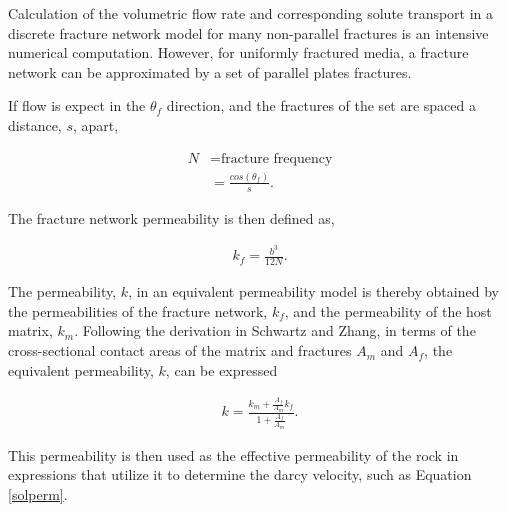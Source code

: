 Calculation of the volumetric flow rate and corresponding solute transport in a
discrete fracture network model for many non-parallel fractures is an intensive
numerical computation. However, for uniformly fractured media, a fracture
network can be approximated by a set of parallel plates fractures. 

If flow is expect in the $\theta_f$ direction, and the fractures of the set are
spaced a distance, $s$, apart,

\begin{align} 
  N &= \mbox{fracture frequency}\nonumber\\ 
  &= \frac{cos(\theta_f)}{s}.  
  \label{fracfreq} 
\end{align}

The fracture network permeability is then defined as, 

\begin{align} 
  k_f =
\frac{b^3}{12N}.  
\label{fracperm} 
\end{align}

The permeability, $k$, in an equivalent permeability model is thereby obtained
by the permeabilities of the fracture network, $k_f$, and the permeability of
the host matrix, $k_m$. Following the derivation in Schwartz and Zhang, in
terms of the cross-sectional contact areas of the matrix and fractures $A_m$
and $A_f$, the equivalent permeability, $k$, can be expressed

\begin{align} 
  k = \frac{k_m + \frac{A_f}{A_m}k_f}{1+\frac{A_f}{A_m}}.
  \label{equivperm} 
\end{align}

This permeability is then used as the effective permeability of the rock in 
expressions that utilize it to determine the darcy velocity, such as Equation 
\eqref{solperm}.





